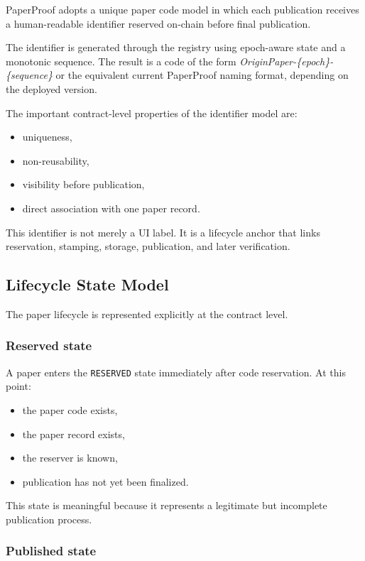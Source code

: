 \documentclass[journal]{IEEEtran}
\begin{document}
PaperProof adopts a unique paper code model in which each publication receives a human-readable identifier reserved on-chain before final publication.

The identifier is generated through the registry using epoch-aware state and a monotonic sequence. The result is a code of the form \textit{OriginPaper-\{epoch\}-\{sequence\}} or the equivalent current PaperProof naming format, depending on the deployed version.

The important contract-level properties of the identifier model are:
\begin{itemize}
    \item uniqueness,
    \item non-reusability,
    \item visibility before publication,
    \item direct association with one paper record.
\end{itemize}


This identifier is not merely a UI label. It is a lifecycle anchor that links reservation, stamping, storage, publication, and later verification.

\subsection{Lifecycle State Model}

The paper lifecycle is represented explicitly at the contract level.

\subsubsection{Reserved state}

A paper enters the \texttt{RESERVED} state immediately after code reservation. At this point:
\begin{itemize}
    \item the paper code exists,
    \item the paper record exists,
    \item the reserver is known,
    \item publication has not yet been finalized.
\end{itemize}


This state is meaningful because it represents a legitimate but incomplete publication process.

\subsubsection{Published state}
\end{document}
